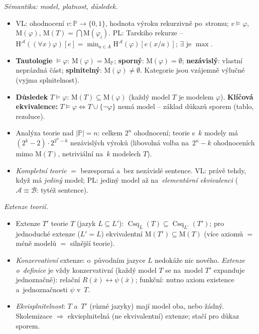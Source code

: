 \documentclass[11pt,a4paper]{article}
\newcommand{\Mset}{\mathrm{M}}              %
\newcommand{\Csq}{\operatorname{Csq}}       %
\begin{document}
\begin{poznamka}
\smallskip
\emph{Sémantika: model, platnost, důsledek.}
\begin{itemize}
  \item VL: ohodnocení $v\colon\mathbb{P}\to\{0,1\}$, hodnota výroku rekurzivně po~stromu; $v\models\varphi$, $\Mset(\varphi)$, $\Mset(T)=\bigcap\Mset(\varphi_i)$. PL: Tarskiho rekurze -- $\mathrm{H}^{\mathcal A}((\forall x)\varphi)[e]=\min_{a\in A}\mathrm{H}^{\mathcal A}(\varphi)[e(x/a)]$; $\exists$ je $\max$.
  \item \textbf{Tautologie} $\models\varphi$: $\Mset(\varphi)=\Mset_{\mathbb{P}}$; \textbf{sporný}: $\Mset(\varphi)=\emptyset$; \textbf{nezávislý}: vlastní neprázdná část; \textbf{splnitelný}: $\Mset(\varphi)\neq\emptyset$. Kategorie jsou vzájemně výlučné (vyjma splnitelnost).
  \item \textbf{Důsledek} $T\models\varphi$: $\Mset(T)\subseteq\Mset(\varphi)$ (každý model $T$ je modelem $\varphi$). \textbf{Klíčová ekvivalence:} $T\models\varphi\iff T\cup\{\neg\varphi\}$ nemá model -- základ důkazů sporem (tablo, rezoluce).
  \item Analýza teorie nad $|\mathbb{P}|=n$: celkem $2^n$ ohodnocení; teorie s~$k$ modely má $(2^k{-}2)\cdot 2^{2^n-k}$ nezávislých výroků (libovolná volba na~$2^n-k$ ohodnoceních mimo $\Mset(T)$, netriviální na~$k$ modelech $T$).
  \item \emph{Kompletní teorie} $=$ bezesporná a~bez nezávislé sentence. VL: právě tehdy, když má \emph{jediný} model; PL: jediný model až na~\emph{elementární ekvivalenci} ($\mathcal A\equiv\mathcal B$: tytéž sentence).
\end{itemize}

\smallskip
\emph{Extenze teorií.}
\begin{itemize}
  \item Extenze $T'$ teorie $T$ (jazyk $L\subseteq L'$): $\Csq_L(T)\subseteq\Csq_{L'}(T')$; pro jednoduché extenze ($L'=L$) ekvivalentní $\Mset(T')\subseteq\Mset(T)$ (více axiomů $=$ méně modelů $=$ silnější teorie).
  \item \emph{Konzervativní} extenze: o~původním jazyce $L$ nedokáže nic nového. \emph{Extenze o~definice} je vždy konzervativní (každý model $T$ se na~model $T'$ expanduje jednoznačně): relační $R(\bar x)\leftrightarrow\psi(\bar x)$; funkční: nutno axiom existence a~jednoznačnosti $\psi$ v~$T$.
  \item \emph{Ekvisplnitelnost}: $T$ a~$T'$ (různé jazyky) mají model oba, nebo žádný. Skolemizace $\Rightarrow$ ekvisplnitelná (ne ekvivalentní) extenze; stačí pro důkaz sporem.
\end{itemize}


\end{poznamka}
\end{document}
